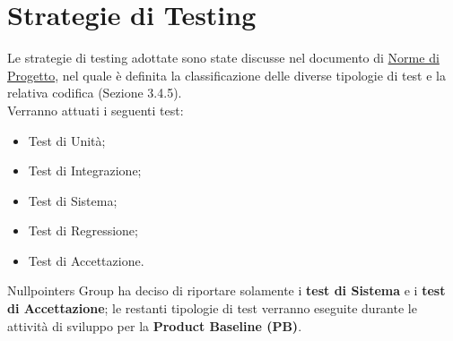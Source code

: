 \section{Strategie di Testing}
Le strategie di testing adottate sono state discusse nel documento di \href{https://nullpointersgroup.github.io/Documentazione/output/RTB/Documenti%20Interni/Norme_di_Progetto.pdf}{Norme di Progetto}, nel quale è definita la classificazione delle diverse tipologie di test e la relativa codifica (Sezione 3.4.5).\\
Verranno attuati i seguenti test:
\begin{itemize}
    \item Test di Unità;
    \item Test di Integrazione;
    \item Test di Sistema;
    \item Test di Regressione;
    \item Test di Accettazione.
\end{itemize}
Nullpointers Group ha deciso di riportare solamente i \textbf{test di Sistema} e i \textbf{test di Accettazione}; le restanti tipologie di test verranno eseguite durante le attività di sviluppo per la \textbf{Product Baseline (PB)}.
